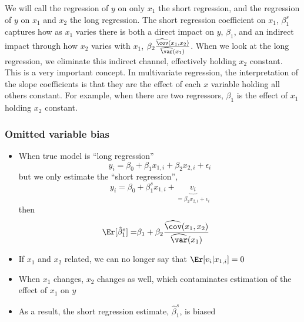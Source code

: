 We will call the regression of $y$ on only $x_1$ the short regression,
and the regression of $y$ on $x_1$ and $x_2$ the long regression. The
short regression coefficient on $x_1$, $\beta_1^s$ captures how as
$x_1$ varies there is both a direct impact on $y$, $\beta_1$, and an
indirect impact through how $x_2$ varies with $x_1$,
$\beta_2 \frac{\widehat{\cov}(x_1,x_2)}{\widehat{\var}(x_1)}$. When we
look at the long regression, we eliminate this indirect channel,
effectively holding $x_2$ constant. This is a very important
concept. In multivariate regression, the interpretation of the slope
coefficients is that they are the effect of each $x$ variable holding
all others constant. For example, when there are two regressors,
$\beta_1$ is the effect of $x_1$ holding $x_2$ constant.

\begin{frame}
  \frametitle{Omitted variable bias}
  \begin{itemize}
  \item When true model is ``long regression''
    \[ y_i = \beta_0 + \beta_1 x_{1,i} + \beta_2 x_{2,i} +
    \epsilon_i \]
    but we only estimate the ``short regression'',
    \[ y_i = \beta_0 + \beta_1^s x_{1,i} + \underbrace{v_i}_{=\beta_2 x_{2,i} +
      \epsilon_i} \]
    then 
    \begin{align*}
      \Er[\hat{\beta}_1^s] = & \beta_1 + \beta_2
      \frac{\widehat{\cov}(x_1,x_2)}{\widehat{\var}(x_1)} 
    \end{align*}
  \item If $x_1$ and $x_2$ related, we can no longer say that
    $\Er[v_i|x_{1,i}] = 0$
  \item When $x_1$ changes, $x_2$ changes as well, which contaminates
    estimation of the effect of $x_1$ on $y$
  \item As a result, the short regression estimate, $\hat{\beta}_1^s$,
    is biased
  \end{itemize}
\end{frame}

